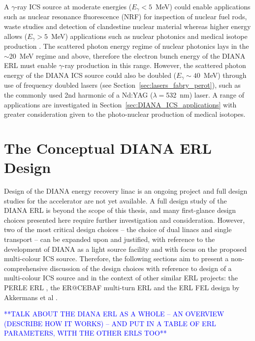 \documentclass[../main.tex]{subfiles}
\begin{document}
A $\gamma$-ray ICS source at moderate energies ($E_{\gamma} < 5$~\si{\mega\electronvolt}) could enable applications such as nuclear resonance fluorescence (NRF) for inspection of nuclear fuel rods, waste studies and detection of clandestine nuclear material \cite{angell2015demonstration,bolind2015states} whereas higher energy allows ($E_{\gamma} > 5$~\si{\mega\electronvolt}) applications such as nuclear photonics \cite{budker2021expanding} and medical isotope production \cite{habs2011production}. The scattered photon energy regime of nuclear photonics lays in the $\sim$20~\si{\mega\electronvolt} regime and above, therefore the electron bunch energy of the DIANA ERL must enable $\gamma$-ray production in this range. However, the scattered photon energy of the DIANA ICS source could also be doubled ($E_{\gamma}\sim 40$~\si{\mega\electronvolt}) through use of frequency doubled lasers (see Section~\ref{sec:lasers_fabry_perot}), such as the commonly used 2nd harmonic of a Nd:YAG ($\lambda =$532~\si{\nano\meter}) laser. A range of applications are investigated in Section~\ref{sec:DIANA_ICS_applications} with greater consideration given to the photo-nuclear production of medical isotopes. 

\section{The Conceptual DIANA ERL Design}
\label{sec:DIANA_ERL_design}

Design of the DIANA energy recovery linac is an ongoing project and full design studies for the accelerator are not yet available. A full design study of the DIANA ERL is beyond the scope of this thesis, and many first-glance design choices presented here require further investigation and consideration. However, two of the most critical design choices -- the choice of dual linacs and single transport -- can be expanded upon and justified, with reference to the development of DIANA as a light source facility and with focus on the proposed multi-colour ICS source. Therefore, the  following sections aim to present a non-comprehensive discussion of the design choices with reference to design of a multi-colour ICS source and in the context of other similar ERL projects: the PERLE ERL \cite{angal2018perle}, the ER@CEBAF multi-turn ERL \cite{meot2016er} and the ERL FEL design by Akkermans et al \cite{akkermans2017compact}. 

\textcolor{blue}{**TALK ABOUT THE DIANA ERL AS A WHOLE -- AN OVERVIEW (DESCRIBE HOW IT WORKS) -- AND PUT IN A TABLE OF ERL PARAMETERS, WITH THE OTHER ERLS TOO**}
\end{document}
